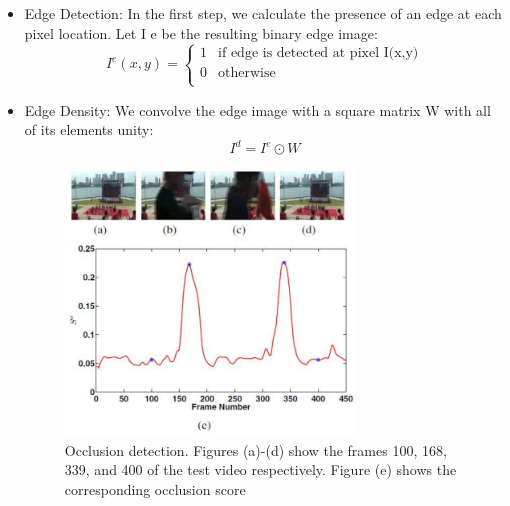 \documentclass{sig-alternate-05-2015}
\begin{document}
 \begin{itemize} 
    \item Edge Detection: In the first step, we calculate the presence of an edge at each pixel location. Let I e be the resulting binary edge image:\\
\begin{equation}
I^e(x,y) = \left\{\begin{array}{ll}
    1 & \text{if edge is detected at pixel I(x,y)}\\
    0 & \text{otherwise}\\
    \end{array}\right.
\end{equation}
    \item Edge Density: We convolve the edge image with a square
matrix W with all of its elements unity:
\begin{equation}
    I^d=I^e\odot W
\end{equation}

\begin{figure}
\centering
\includegraphics[width=1\linewidth,height=200pt]{video.pdf}
\caption{Occlusion detection. Figures (a)-(d) show the frames
100, 168, 339, and 400 of the test video respectively. Figure (e)
shows the corresponding occlusion score}
\end{figure}


\end{itemize}
\end{document}
